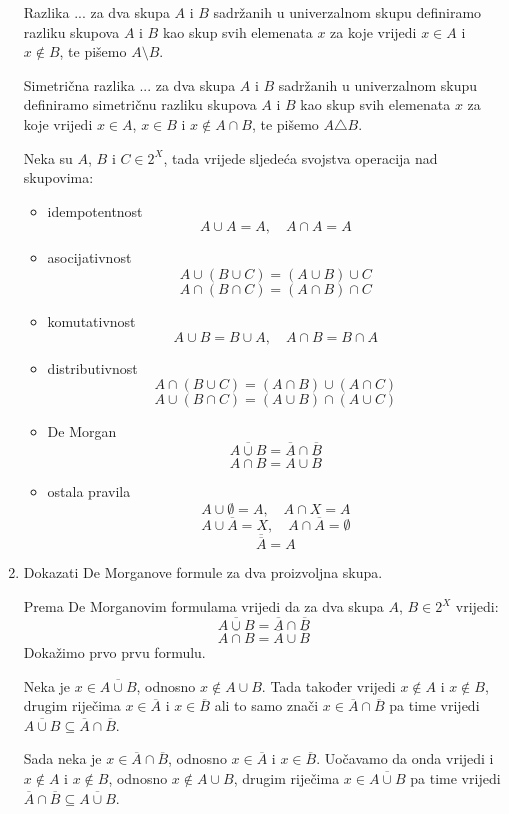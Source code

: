 \documentclass{article}
\begin{document}
\begin{enumerate}
Razlika ... za dva skupa $A$ i $B$ sadržanih u univerzalnom skupu definiramo razliku skupova $A$ i $B$ kao skup svih elemenata $x$ za koje vrijedi $x\in A$ i $x\notin B$, te pišemo $A\setminus B$.

Simetrična razlika ... za dva skupa $A$ i $B$ sadržanih u univerzalnom skupu definiramo simetričnu razliku skupova $A$ i $B$ kao skup svih elemenata $x$ za koje vrijedi $x\in A$, $x\in B$ i $x\notin A\cap B$, te pišemo $A\triangle B$.

Neka su $A$, $B$ i $C\in 2^{X}$, tada vrijede sljedeća svojstva operacija nad skupovima:
\begin{itemize}
\item idempotentnost
$$A\cup A = A , \quad A\cap A = A$$
\item asocijativnost
$$A\cup(B\cup C) = (A\cup B)\cup C$$
$$A\cap(B\cap C) = (A\cap B)\cap C$$
\item komutativnost
$$A\cup B = B\cup A, \quad A\cap B = B\cap A$$
\item distributivnost
$$A\cap(B\cup C) = (A\cap B)\cup(A\cap C)$$
$$A\cup(B\cap C) = (A\cup B)\cap(A\cup C)$$
\item De Morgan
$$\overline{A\cup B} = \overline{A}\cap\overline{B}$$
$$\overline{A\cap B} = \overline{A}\cup\overline{B}$$
\item ostala pravila
$$A\cup\emptyset = A, \quad A\cap X = A$$
$$A\cup\overline{A} = X, \quad A\cap\overline{A} = \emptyset$$
$$\overline{\overline{A}} = A$$
\end{itemize}

\item Dokazati De Morganove formule za dva proizvoljna skupa.

Prema De Morganovim formulama vrijedi da za dva skupa $A$, $B \in 2^{X}$ vrijedi:
$$\overline{A\cup B} = \overline{A}\cap\overline{B}$$
$$\overline{A\cap B} = \overline{A}\cup\overline{B}$$
Dokažimo prvo prvu formulu.

Neka je $x\in\overline{A\cup B}$, odnosno $x\notin A\cup B$. Tada također vrijedi $x\notin A$ i $x\notin B$, drugim riječima $x\in \overline{A}$ i $x\in\overline{B}$ ali to samo znači $x\in\overline{A}\cap\overline{B}$ pa time vrijedi $\overline{A\cup B}\subseteq\overline{A}\cap\overline{B}$.

Sada neka je $x\in\overline{A}\cap\overline{B}$, odnosno $x\in\overline{A}$ i $x\in\overline{B}$. Uočavamo da onda vrijedi i $x\notin A$ i $x\notin B$, odnosno $x\notin A\cup B$, drugim riječima $x\in\overline{A\cup B}$ pa time vrijedi $\overline{A}\cap\overline{B}\subseteq\overline{A\cup B}$.


\end{enumerate}
\end{document}
